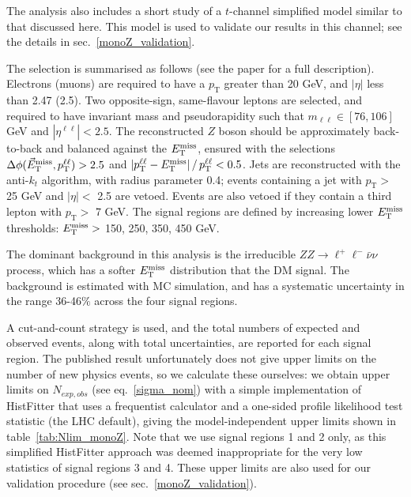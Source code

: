 The analysis also includes a short study of a $t$-channel simplified model similar to that discussed here. This model is used to validate our results in this channel; see the details in sec.~\ref{monoZ_validation}.

The selection is summarised as follows (see the paper for a full description). Electrons (muons) are required to have a $p_{\mathrm{T}}$ greater than 20 GeV, and $|\eta|$ less than 2.47 (2.5). Two opposite-sign, same-flavour leptons are selected, and required to have invariant mass and pseudorapidity such that $m_{\ell \ell} \in [76, 106]$ GeV and $|\eta^{\ell \ell}| < 2.5$. The reconstructed $Z$ boson should be approximately back-to-back and balanced against the $E_{\mathrm{T}}^{\mathrm{miss}}$, ensured with the selections $\Delta \phi (\vec{E}_{\mathrm{T}}^{\mathrm{miss}}, p_{\mathrm{T}}^{\ell \ell}) > 2.5$ and $| p_{\mathrm{T}}^{\ell \ell} - E_{\mathrm{T}}^{\mathrm{miss}} | \, /  \, p_{\mathrm{T}}^{\ell \ell} < 0.5$. Jets are reconstructed with the anti-$k_t$ algorithm, with radius parameter 0.4; events containing a jet with $p_{\mathrm{T}}>$ 25 GeV and $|\eta|< $ 2.5 are vetoed. Events are also vetoed if they contain a third lepton with $p_{\mathrm{T}}>$ 7 GeV. The signal regions are defined by increasing lower $E_{\mathrm{T}}^{\mathrm{miss}}$ thresholds: $E_{\mathrm{T}}^{\mathrm{miss}} >$ 150, 250, 350, 450 GeV. 


The dominant background in this analysis is the irreducible $ZZ \rightarrow \ell^+ \ell^- \bar{\nu} \nu$ process, which has a softer $E_{\mathrm{T}}^{\mathrm{miss}}$ distribution that the DM signal. The background is estimated with MC simulation, and has a systematic uncertainty in the range 36-46$\%$ across the four signal regions. 

A cut-and-count strategy is used, and the total numbers of expected and observed events, along with total uncertainties, are reported for each signal region. The published result unfortunately does not give upper limits on the number of new physics events, so we calculate these ourselves: we obtain upper limits on $N_{exp,obs}$ (see eq.~\ref{sigma_nom}) with a simple implementation of HistFitter that uses a frequentist calculator and a one-sided profile likelihood test statistic (the LHC default), giving the model-independent upper limits shown in table~\ref{tab:Nlim_monoZ}. Note that we use signal regions 1 and 2 only, as this simplified HistFitter approach was deemed inappropriate for the very low statistics of signal regions 3 and 4. These upper limits are also used for our validation procedure (see sec.~\ref{monoZ_validation}).

